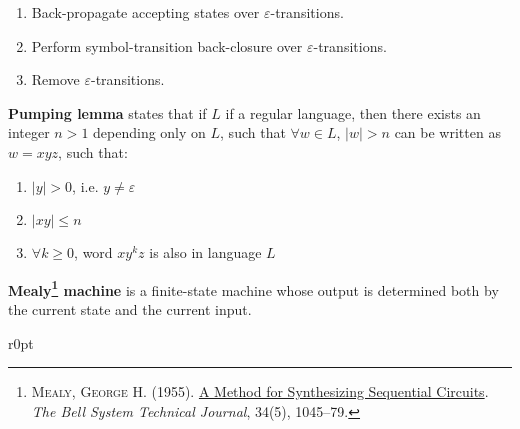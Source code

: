 \documentclass[a4paper,10pt]{article}
\begin{document}
\begin{terms}
\begin{enumerate}
        \item Back-propagate accepting states over $\varepsilon$-transitions.

        \item Perform symbol-transition back-closure over $\varepsilon$-transitions.

        \item Remove $\varepsilon$-transitions.
    \end{enumerate}

    \item \textbf{Pumping lemma} states that if $L$ if a regular language, then there exists an integer $n > 1$ depending only on $L$, such that $\forall w \in L$, $|w| > n$ can be written as $w = xyz$, such that:

    \begin{enumerate}
        \item $|y| > 0$, i.e. $y \neq \varepsilon$

        \item $|xy| \leq n$

        \item $\forall k \geq 0$, word $x y^{k} z$ is also in language $L$
    \end{enumerate}


    \item \textbf{Mealy\footnote{\textsc{Mealy, George H.} (1955).
    \href{https://doi.org/10.1002/j.1538-7305.1955.tb03788.x}{A Method for Synthesizing Sequential Circuits}.
    \textit{The Bell System Technical Journal}, 34(5), 1045--79.} machine} is a finite-state machine whose output is determined both by the current state and the current input.

    \begin{minipage}{\linewidth}
    \begin{wrapfigure}{r}{0pt}
        \vspace{-\intextsep}
    \end{wrapfigure}


\end{minipage}
\end{terms}
\end{document}
